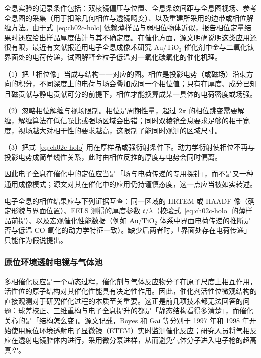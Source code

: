 \begin{measure}
全息实验的记录条件包括：双棱镜偏压与位置、全息条纹间距与全息图视场、参考全息图的采集（用于扣除几何相位与透镜畸变）、以及重建所采用的边带或相位解缠方法。由于式~\eqref{eq:ch02c-holo} 依赖薄样品与弱相位物体近似，报告相位定量结果时还应给出样品厚度估计与其不确定度。在催化方面，源文明确说明这类应用还很有限，最近有文献报道用电子全息成像术研究 Au/TiO$_2$ 催化剂中金与二氧化钛界面处的电荷传递，试图解释金粒子低温对一氧化碳氧化的催化机理。
\end{measure}

\begin{pitfall}
（1）把「相位像」当成与结构一一对应的图。相位是投影电势（或磁场）沿束方向的积分，不同深度上的电荷与场会叠加成同一个相位值；只有在厚度、成分已知且磁贡献与静电贡献可分的前提下，相位才能换算成某一具体的电荷密度或场强。

（2）忽略相位解缠与视场限制。相位是周期性量，超过 $2\pi$ 的相位跳变需要解缠，解缠算法在低信噪比或强场区域会出错；同时双棱镜全息要求足够的相干宽度，视场越大对相干性的要求越高，这限制了能同时观测的区域尺寸。

（3）把式~\eqref{eq:ch02c-holo} 用在厚样品或强衍射条件下。动力学衍射使相位不再与投影电势成简单线性关系，此时由相位反推的厚度与电势会同时偏离。

因此电子全息在催化中的定位应当是「场与电荷传递的专用探针」，而不是又一种通用成像模式；源文对其在催化中的应用仍持谨慎态度，这一点应当被如实转述。
\end{pitfall}

\begin{crosscheck}
电子全息的相位结果应与下列证据互查：同一区域的 HRTEM 或 HAADF 像（确定形貌与界面位置）、EELS 测得的厚度参数 $t/\lambda$（校验式~\eqref{eq:ch02c-holo} 的薄样品前提）、以及宏观催化性能数据（例如 Au/TiO$_2$ 体系中界面电荷传递的推断是否与低温 CO 氧化的动力学特征一致）。缺少后两者时，「界面处存在电荷传递」只能作为假说提出。
\end{crosscheck}

\subsubsection{原位环境透射电镜与气体池}

多相催化反应是一个动态过程，催化剂与气体反应物分子在原子尺度上相互作用，活性位的原子结构对其催化性能具有决定性作用。因此，催化剂活性位微观结构的直接观测对于研究催化过程的本质至关重要。这正是前几项技术都无法回答的问题：球差校正、三维重构与电子全息提升的都是「静态结构看得多清楚」，而催化关心的是「结构怎么变」。源文记载，Boyes 和 Gai 等分别于 1997 年和 1998 年开始使用原位环境透射电子显微镜（ETEM）实时监测催化反应；研究人员将气相反应在透射电镜腔体内进行，采用微分泵进样，从而避免气体分子进入电子枪的超高真空。

